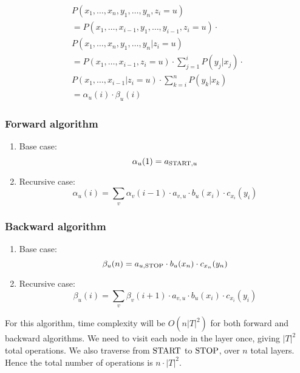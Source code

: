 \documentclass[9pt,twocolumn]{article}
\newcommand{\START}{\text{\lstinline{START}}}
\newcommand{\STOP}{\text{\lstinline{STOP}}}
\begin{document}
            \begin{equation}
            \begin{split}
                P(x_1, \ldots, x_n, y_1, \ldots, y_n, z_i = u)\\
                = P(x_1, \ldots, x_{i-1}, y_1, \ldots, y_{i-1}, z_i = u)\cdot \\
                P(x_1, \ldots, x_n, y_1, \ldots, y_n | z_i = u)    \\
                = P(x_1, \ldots, x_{i-1}, z_i = u) \cdot \sum_{j=1}^{i} P(y_j|x_j) \cdot\\
                P(x_1, \ldots, x_{i-1} | z_i = u) \cdot \sum_{k=i}^{n} P(y_k|x_k)\\
                = \alpha_u(i) \cdot \beta_u(i)
            \end{split}
            \end{equation}

            \subsubsection*{Forward algorithm}
            \begin{enumerate}
                \item
                Base case:
                \begin{equation}
                    \alpha_u (1) = a_{\START,u}
                \end{equation}
                \item
                Recursive case:
                \begin{equation}
                    \alpha_u (i) = \sum_{v} \alpha_v(i-1) \cdot a_{v,u} \cdot b_u(x_i) \cdot c_{x_i}(y_i)
                \end{equation}
            \end{enumerate}

            \subsubsection*{Backward algorithm}
            \begin{enumerate}
                \item
                Base case:
                \begin{equation}
                    \beta_u (n) = a_{u, \STOP} \cdot b_u(x_n) \cdot c_{x_n} (y_n)
                \end{equation}
                \item
                Recursive case:
                \begin{equation}
                    \beta_u (i) = \sum_{v} \beta_v(i+1) \cdot a_{v,u} \cdot b_u(x_i) \cdot c_{x_i}(y_i)
                \end{equation}
            \end{enumerate}

            For this algorithm, time complexity will be $O(n|T|^2)$ for both forward and backward algorithms. We need to visit each node in the layer once, giving $|T|^2$ total operations. We also traverse from $\START$ to $\STOP$, over $n$ total layers. Hence the total number of operations is $n\cdot|T|^2$.
\end{document}
